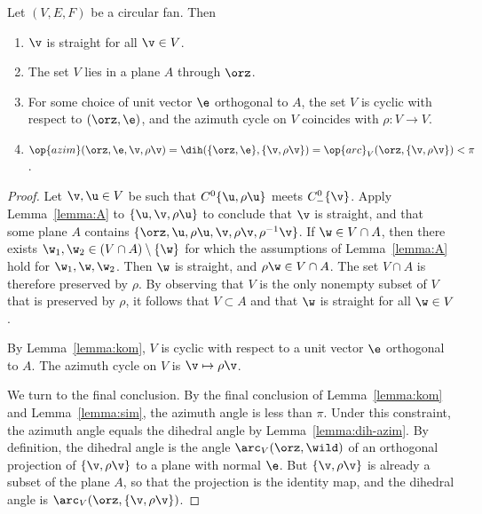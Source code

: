 \begin{lemma}
\label{lemma:circular}
Let $(V,E,F)$ be a circular fan. Then
\begin{enumerate}\wasitemize 
\item $\v$ is straight for all $\v\in V$.
\item The set $V$ lies in a plane $A$ through $\orz$.
\item For some choice of unit vector $\e$ orthogonal to $A$, the set
$V$ is cyclic with respect to $(\orz,\e)$, and the azimuth cycle on
$V$ coincides with $\rho:V\to V$.  
\item 
$
\op{azim}(\orz,\e,\v,\rho\v) = \dih(\{\orz,\e\},\{\v,\rho\v\})
=\op{arc}_V(\orz,\{\v,\rho \v\}) <\pi
$.
\end{enumerate}\wasitemize 
\end{lemma}

\begin{proof} Let $\v, \u\in V$ be such that $C^0\{\u,\rho \u\}$ meets
$C^0_-\{\v\}$.  Apply Lemma~\ref{lemma:A} to $\{\u,\v,\rho \u\}$ to
conclude that $\v$ is straight, and that some plane $A$ contains
$\{\orz,\u,\rho\u,\v,\rho \v,\rho^{-1} \v\}$.  If
$\w\in V\cap A$, then there exists $\w_1,\w_2\in (V\cap
A)\setminus\{\w\}$ for which the assumptions of Lemma~\ref{lemma:A}
hold for $\w_1,\w,\w_2$.  
Then $\w$ is straight, and $\rho \w \in V\cap A$.  The set $V\cap
A$ is therefore preserved by $\rho$.  By observing that $V$ is the
only nonempty subset of $V$ that is preserved by $\rho$, it follows
that $V\subset A$ and that $\w$ is straight for all $\w\in V$.


By Lemma~\ref{lemma:kom}, $V$ is cyclic with respect to a unit
vector $\e$ orthogonal to $A$.  The azimuth cycle on $V$ is $\v
\mapsto \rho \v$.

We turn to the final conclusion.  By the final conclusion of
Lemma~\ref{lemma:kom} and Lemma~\ref{lemma:sim}, the azimuth angle is
less than $\pi$.  Under this constraint, the azimuth angle equals the
dihedral angle by Lemma~\ref{lemma:dih-azim}.  By definition, the
dihedral angle is the angle $\arc_V(\orz,\wild )$ of an orthogonal
projection of $\{\v,\rho\v\}$ to a plane with normal $\e$.  But
$\{\v,\rho\v\}$ is already a subset of the plane $A$, so that the
projection is the identity map, and the dihedral angle is
$\arc_V(\orz,\{\v,\rho\v\})$.
%
\end{proof}


